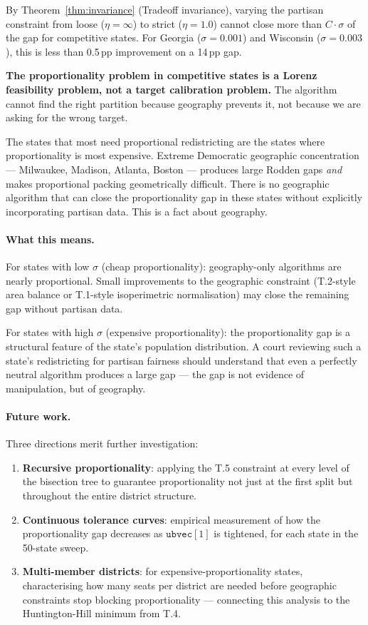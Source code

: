 By Theorem~\ref{thm:invariance} (Tradeoff invariance), varying the partisan
constraint from loose ($\eta = \infty$) to strict ($\eta = 1.0$) cannot close
more than $C \cdot \sigma$ of the gap for competitive states. For Georgia
($\sigma = 0.001$) and Wisconsin ($\sigma = 0.003$), this is less than 0.5\,pp
improvement on a 14\,pp gap.

\textbf{The proportionality problem in competitive states is a Lorenz feasibility
problem, not a target calibration problem.}
The algorithm cannot find the right partition because geography prevents it,
not because we are asking for the wrong target.

The states that most need proportional redistricting are the states where
proportionality is most expensive.
Extreme Democratic geographic concentration --- Milwaukee, Madison, Atlanta,
Boston --- produces large Rodden gaps \emph{and} makes proportional packing
geometrically difficult.
There is no geographic algorithm that can close the proportionality gap
in these states without explicitly incorporating partisan data.
This is a fact about geography.

\paragraph{What this means.}
For states with low $\sigma$ (cheap proportionality): geography-only algorithms
are nearly proportional. Small improvements to the geographic constraint
(T.2-style area balance or T.1-style isoperimetric normalisation) may close
the remaining gap without partisan data.

For states with high $\sigma$ (expensive proportionality): the proportionality
gap is a structural feature of the state's population distribution.
A court reviewing such a state's redistricting for partisan fairness should
understand that even a perfectly neutral algorithm produces a large gap ---
the gap is not evidence of manipulation, but of geography.

\paragraph{Future work.}
Three directions merit further investigation:
\begin{enumerate}
\item \textbf{Recursive proportionality}: applying the T.5 constraint at
  every level of the bisection tree to guarantee proportionality not just
  at the first split but throughout the entire district structure.

\item \textbf{Continuous tolerance curves}: empirical measurement of how the
  proportionality gap decreases as $\mathtt{ubvec}[1]$ is tightened, for each
  state in the 50-state sweep.

\item \textbf{Multi-member districts}: for expensive-proportionality states,
  characterising how many seats per district are needed before geographic
  constraints stop blocking proportionality --- connecting this analysis to
  the Huntington-Hill minimum from T.4.
\end{enumerate}
